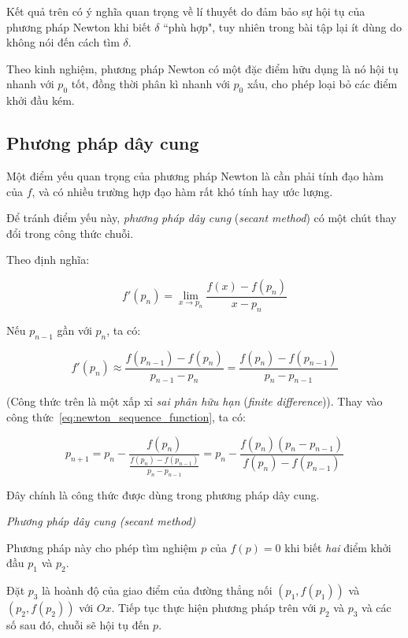 \documentclass[../../Lectures.tex]{subfiles}
\begin{document}
Kết quả trên có ý nghĩa quan trọng về lí thuyết do đảm bảo sự hội tụ của phương
pháp Newton khi biết \(\delta\) ``phù hợp", tuy nhiên trong bài tập lại ít dùng
do không nói đến cách tìm \(\delta\).

Theo kinh nghiệm, phương pháp Newton có một đặc điểm hữu dụng là nó hội tụ nhanh
với \(p_0\) tốt, đồng thời phân kì nhanh với \(p_0\) xấu, cho phép loại bỏ các
điểm khởi đầu kém.

\subsection{Phương pháp dây cung}

Một điểm yếu quan trọng của phương pháp Newton là cần phải tính đạo hàm của
\(f\), và có nhiều trường hợp đạo hàm rất khó tính hay ước lượng.

Để tránh điểm yếu này, \emph{phương pháp dây cung} (\emph{secant method}) có một
chút thay đổi trong công thức chuỗi.

Theo định nghĩa:

\[f'(p_n) = \lim_{x \to p_n} \frac{f(x) - f(p_n)}{x - p_n}\]

Nếu \(p_{n - 1}\) gần với \(p_n\), ta có:

\[f'(p_n) \approx \frac{f(p_{n - 1}) - f(p_n)}{p_{n - 1} - p_n} = \frac{f(p_n) - f(p_{n - 1})}{p_n - p_{n - 1}}\]

(Công thức trên là một xấp xỉ \emph{sai phân hữu hạn} (\emph{finite
difference})). Thay vào công thức~\ref{eq:newton_sequence_function}, ta có:

\begin{equation}\label{eq:secant_method}
    p_{n + 1} = p_n - \frac{f(p_n)}{\frac{f(p_n) - f(p_{n - 1})}{p_n - p_{n - 1}}} = p_n - \frac{f(p_n) (p_n - p_{n - 1})}{f(p_n) - f(p_{n - 1})}
\end{equation}

Đây chính là công thức được dùng trong phương pháp dây cung.

\begin{method}\label{method:secant}
    \emph{Phương pháp dây cung (secant method)}

    Phương pháp này cho phép tìm nghiệm \(p\) của \(f(p) = 0\) khi biết
    \emph{hai} điểm khởi đầu \(p_1\) và \(p_2\).

    Đặt \(p_3\) là hoành độ của giao điểm của đường thẳng nối \((p_1, f(p_1))\)
    và \((p_2, f(p_2))\) với \(Ox\). Tiếp tục thực hiện phương pháp trên với
    \(p_2\) và \(p_3\) và các số sau đó, chuỗi sẽ hội tụ đến \(p\).
\end{method}
\end{document}
